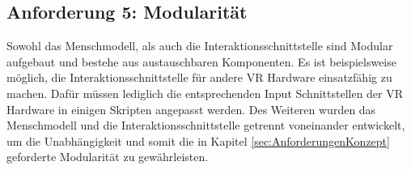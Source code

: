 \subsection{Anforderung 5: Modularität}\label{sec:ValidInteraktion5}
Sowohl das Menschmodell, als auch die Interaktionsschnittstelle sind Modular aufgebaut und bestehe aus austauschbaren Komponenten. Es ist beispielsweise möglich, die Interaktionsschnittstelle für andere VR Hardware einsatzfähig zu machen. Dafür müssen lediglich die entsprechenden Input Schnittstellen der VR Hardware in einigen Skripten angepasst werden. Des Weiteren wurden das Menschmodell und die Interaktionsschnittstelle getrennt voneinander entwickelt, um die Unabhängigkeit und somit die in Kapitel \ref{sec:AnforderungenKonzept} geforderte Modularität zu gewährleisten.

